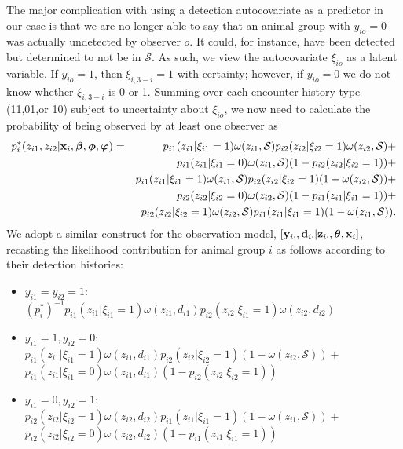 \documentclass[12pt,fleqn]{article}
\begin{document}
The major complication with using a detection autocovariate as a predictor in our case is that we are no longer able to say that an animal group with $y_{io}=0$ was actually undetected by observer $o$.  It could, for instance, have been detected but determined to not be in $\mathcal{S}$.  As such, we view the autocovariate $\xi_{io}$ as a latent variable.  If $y_{io}=1$, then $\xi_{i,3-i}=1$ with certainty; however, if $y_{io}=0$ we do not know whether $\xi_{i,3-i}$ is 0 or 1. Summing over each encounter history type (11,01,or 10) subject to uncertainty about $\xi_{io}$, we now need to calculate the probability of being observed by at least one observer as
\begin{eqnarray*}
  \label{eq:pstar2}
  p_i^*(z_{i1},z_{i2}|{\bf x}_i,\boldsymbol{\beta},\boldsymbol{\phi},\boldsymbol{\varphi}) & = &
  p_{i1}(z_{i1}|\xi_{i1}=1) \omega(z_{i1},\mathcal{S}) p_{i2}(z_{i2}|\xi_{i2}=1) \omega(z_{i2},\mathcal{S}) + \\
   & & p_{i1}(z_{i1}|\xi_{i1}=0)\omega(z_{i1},\mathcal{S})(1-p_{i2}(z_{i2}|\xi_{i2}=1)) + \nonumber \\ & &
   p_{i1}(z_{i1}|\xi_{i1}=1)\omega(z_{i1},\mathcal{S})p_{i2}(z_{i2}|\xi_{i2}=1)(1-\omega(z_{i2},\mathcal{S}))
   + \nonumber \\ & &
    p_{i2}(z_{i2}|\xi_{i2}=0)\omega(z_{i2},\mathcal{S})(1-p_{i1}(z_{i1}|\xi_{i1}=1)) + \nonumber \\ & &
   p_{i2}(z_{i2}|\xi_{i2}=1)\omega(z_{i2},\mathcal{S})p_{i1}(z_{i1}|\xi_{i1}=1)(1-\omega(z_{i1},\mathcal{S})).
   \nonumber
\end{eqnarray*}
We adopt a similar construct for the observation model, $[{\bf y}_{i \cdot},{\bf d}_{i \cdot}|{\bf z}_{i \cdot} , \boldsymbol{\theta} , {\bf x}_i]$, recasting the likelihood contribution for animal group $i$ as follows according to their detection histories:
\begin{itemize}
  \item \underline{$y_{i1}=y_{i2}=1$}: \\
   $(p_i^*)^{-1}
    p_{i1}(z_{i1}|\xi_{i1}=1) \omega(z_{i1},d_{i1}) p_{i2}(z_{i2}|\xi_{i1}=1) \omega(z_{i2},d_{i2})$
  \item \underline{$y_{i1}=1, y_{i2}=0$}: \\
   $p_{i1}(z_{i1}|\xi_{i1}=1)\omega(z_{i1},d_{i1})
    p_{i2}(z_{i2}|\xi_{i2}=1)(1-\omega(z_{i2},\mathcal{S}))+ $ \\
    $p_{i1}(z_{i1}|\xi_{i1}=0)\omega(z_{i1},d_{i1})(1-p_{i2}(z_{i2}|\xi_{i2}=1))$
  \item \underline{$y_{i1}=0, y_{i2}=1$}: \\
    $p_{i2}(z_{i2}|\xi_{i2}=1)\omega(z_{i2},d_{i2})
    p_{i1}(z_{i1}|\xi_{i1}=1)(1-\omega(z_{i1},\mathcal{S}))+$ \\
    $p_{i2}(z_{i2}|\xi_{i2}=0)\omega(z_{i2},d_{i2})(1-p_{i1}(z_{i1}|\xi_{i1}=1))$
\end{itemize}
\end{document}
